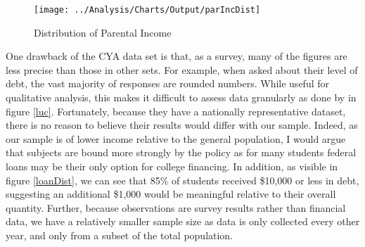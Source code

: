 \documentclass[12pt]{article}
\begin{document}
	\begin{figure}
		\centering
		\caption{Distribution of Parental Income}
		\label{incDist}
		\texttt{[image: ../Analysis/Charts/Output/parIncDist]}
	\end{figure}
	
	One drawback of the CYA data set is that, as a survey, many of the figures are less precise than those in other sets. For example, when asked about their level of debt, the vast majority of responses are rounded numbers. While useful for qualitative analysis, this makes it difficult to assess data granularly as done by \textcite{lucca2018} in figure \ref{luc}. Fortunately, because they have a nationally representative dataset, there is no reason to believe their results would differ with our sample. Indeed, as our sample is of lower income relative to the general population, I would argue that subjects are bound more strongly by the policy as for many students federal loans may be their only option for college financing. In addition, as visible in figure \ref{loanDist}, we can see that 85\% of students received \$10,000 or less in debt, suggesting an additional \$1,000 would be meaningful relative to their overall quantity. Further, because observations are survey results rather than financial data, we have a relatively smaller sample size as data is only collected every other year, and only from a subset of the total population.
	
\end{document}
